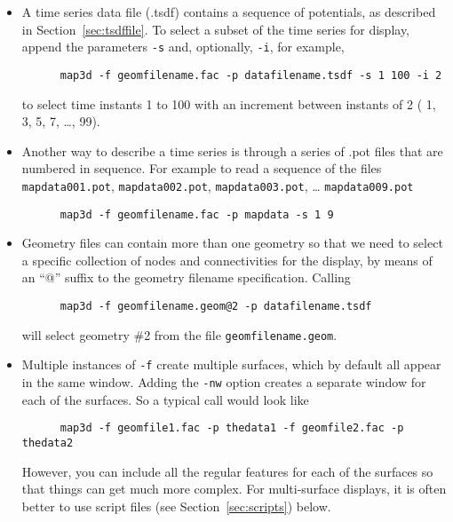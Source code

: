 \begin{itemize}
  \item A time series data file (.tsdf) contains a sequence of 
  potentials, as described in Section~\ref{sec:tsdffile}.
  To select a subset of the time series for display, append the 
  parameters \texttt{-s} and, optionally,  \texttt{-i}, for example,
  \begin{verbatim}
      map3d -f geomfilename.fac -p datafilename.tsdf -s 1 100 -i 2
  \end{verbatim}
  \vspace{-.2in}
  to select time instants 1 to 100 with an increment between instants 
  of 2 (\ie{} 1, 3, 5, 7, \ldots, 99).  

  \item Another way to describe a time series is through a series of .pot
  files that are numbered in sequence.  For example to read a sequence of
  the files \texttt{mapdata001.pot}, \texttt{mapdata002.pot},
  \texttt{mapdata003.pot}, \ldots{}  \texttt{mapdata009.pot}
  \begin{verbatim}
      map3d -f geomfilename.fac -p mapdata -s 1 9 
  \end{verbatim}
  
  \item Geometry files can contain more than one geometry 
  so that we need to select a specific collection of nodes and 
  connectivities for the display, by means of an ``@'' suffix to the 
  geometry filename specification.  Calling 
  \begin{verbatim}
      map3d -f geomfilename.geom@2 -p datafilename.tsdf
  \end{verbatim}
  \vspace{-.2in}
  will select geometry \#2 from the file \texttt{geomfilename.geom}.

  \item Multiple instances of \texttt{-f} create multiple surfaces, which by
  default all appear in the same  window.  Adding the \texttt{-nw} option
  creates a separate window for each of the surfaces.  So a typical call
  would look like
  \begin{verbatim}
      map3d -f geomfile1.fac -p thedata1 -f geomfile2.fac -p thedata2 
  \end{verbatim}
  However, you can include all the regular features for each of the
  surfaces so that things can get much more complex.  For multi-surface
  displays, it is often better to use script files (see
  Section~\ref{sec:scripts}) below.

\end{itemize}


